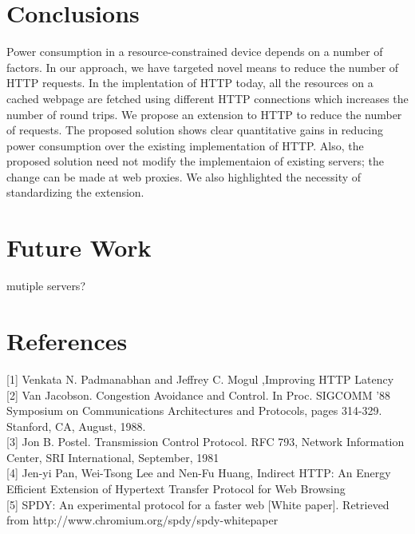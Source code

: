 \documentclass[9pt]{sigplan-proc-varsize}
\begin{document}
\bigskip

\section{Conclusions}

Power consumption in a resource-constrained device depends on a number of factors. In our approach, we have targeted novel means to reduce the number of HTTP requests. In the implentation of HTTP today, all the resources on a cached webpage are fetched using different HTTP connections which increases the number of round trips. We propose an extension to HTTP to reduce the number of requests. The proposed solution shows clear quantitative gains in reducing power consumption over the existing implementation of HTTP. Also, the proposed solution need not modify the implementaion of existing servers; the change can be made at web proxies. We also highlighted the necessity of standardizing the extension.

\bigskip

\section{Future Work}

mutiple servers?

\bigskip

\section{References}

[1] Venkata N. Padmanabhan and Jeffrey C. Mogul ,Improving HTTP Latency \\[\baselineskip]
[2] Van Jacobson. Congestion Avoidance and Control. In Proc. SIGCOMM ’88 Symposium on Communications Architectures and Protocols, pages 314-329. Stanford, CA, August, 1988. \\[\baselineskip]
[3] Jon B. Postel. Transmission Control Protocol. RFC 793, Network Information Center, SRI International, September, 1981 \\[\baselineskip]
[4] Jen-yi Pan, Wei-Tsong Lee and Nen-Fu Huang, Indirect HTTP: An Energy Efficient Extension of Hypertext Transfer Protocol for Web Browsing \\[\baselineskip]
[5] SPDY: An experimental protocol for a faster web [White paper]. Retrieved from http://www.chromium.org/spdy/spdy-whitepaper
\end{document}
